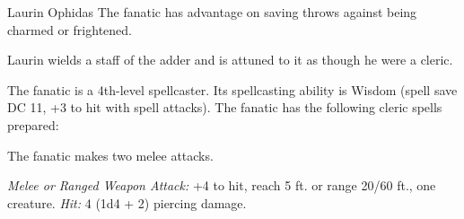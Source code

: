 \documentclass[10pt,a4paper,twoside,twocolumn,openany,nodeprecatedcode]{dndbook}
\begin{document}
\begin{DndMonster}[float=ht]{Laurin Ophidas}
\DndMonsterBasics[
armor-class = {13 (leather armor)},
hit-points = {\DndDice{6d8 + 6}},
speed = {30 ft.}
]
\DndMonsterAbilityScores[
 str = 11,
 dex = 14,
 con = 12,
 int = 10,
 wis = 13,
 cha = 14
]
\DndMonsterDetails[
skills = {Deception +4, Persuasion +4, Religion +2},
damage-immunities = {poison},
languages = {Any one language (usually Common)},
challenge = 2,
]
The fanatic has advantage on saving throws against being charmed or frightened.

Laurin wields a staff of the adder and is attuned to it as though he were a cleric.

The fanatic is a 4th-level spellcaster. Its spellcasting ability is Wisdom (spell save DC 11, +3 to hit with spell attacks). The fanatic has the following cleric spells prepared:
\begin{DndMonsterSpells}
\end{DndMonsterSpells}
\par
{}
The fanatic makes two melee attacks.

\textsl{Melee or Ranged Weapon Attack:} +4 to hit, reach 5 ft. or range 20/60 ft., one creature. \textsl{Hit:} 4 (1d4 + 2) piercing damage.

\end{DndMonster}


\clearpage
{}
\end{document}
